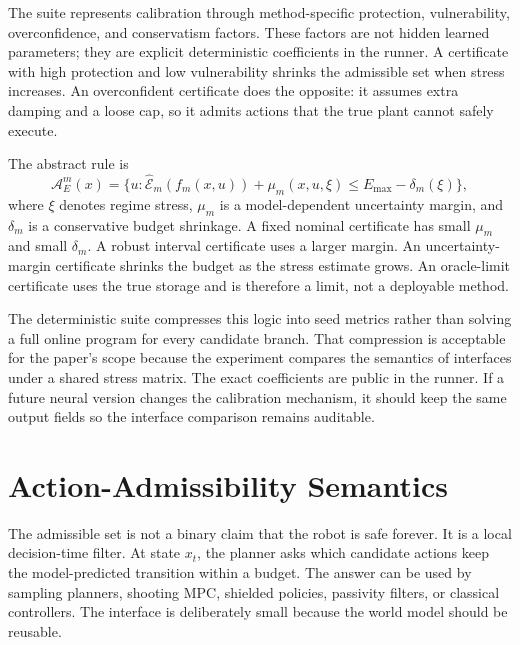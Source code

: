 \documentclass{article}
\newcommand{\state}{x}
\newcommand{\action}{u}
\newcommand{\storage}{\mathcal{E}}
\newcommand{\admiss}{\mathcal{A}}
\begin{document}
The suite represents calibration through method-specific protection, vulnerability, overconfidence, and conservatism factors. These factors are not hidden learned parameters; they are explicit deterministic coefficients in the runner. A certificate with high protection and low vulnerability shrinks the admissible set when stress increases. An overconfident certificate does the opposite: it assumes extra damping and a loose cap, so it admits actions that the true plant cannot safely execute.

The abstract rule is
\begin{equation}
    \admiss_E^{m}(\state)
    =
    \{\action:
    \hat{\storage}_{m}(f_m(\state,\action))
    + \mu_m(\state,\action,\xi)
    \leq
    E_{\max}-\delta_m(\xi)\},
\end{equation}
where $\xi$ denotes regime stress, $\mu_m$ is a model-dependent uncertainty margin, and $\delta_m$ is a conservative budget shrinkage. A fixed nominal certificate has small $\mu_m$ and small $\delta_m$. A robust interval certificate uses a larger margin. An uncertainty-margin certificate shrinks the budget as the stress estimate grows. An oracle-limit certificate uses the true storage and is therefore a limit, not a deployable method.

The deterministic suite compresses this logic into seed metrics rather than solving a full online program for every candidate branch. That compression is acceptable for the paper's scope because the experiment compares the semantics of interfaces under a shared stress matrix. The exact coefficients are public in the runner. If a future neural version changes the calibration mechanism, it should keep the same output fields so the interface comparison remains auditable.

\clearpage
\section{Action-Admissibility Semantics}

The admissible set is not a binary claim that the robot is safe forever. It is a local decision-time filter. At state $\state_t$, the planner asks which candidate actions keep the model-predicted transition within a budget. The answer can be used by sampling planners, shooting MPC, shielded policies, passivity filters, or classical controllers. The interface is deliberately small because the world model should be reusable.
\end{document}
